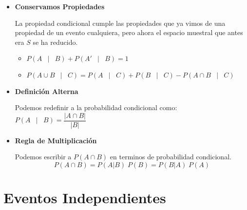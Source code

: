 \documentclass[12pt, fleqn]{report}                             %
\DeclareMathOperator \Space     {\quad}                         %
\DeclareMathOperator \MiniSpace {\;}                            %
\newcommand \Such           {\MiniSpace | \MiniSpace}           %
\theoremstyle{break}                                            %
\newcommand{\Wrap}[1]           {\left( #1 \right)}             %
\newcommand{\Mag}[1]    {\left| #1 \right|}                     %
\begin{document}
                \begin{itemize}

                    \item
                        \textbf{Conservamos Propiedades}

                        La propiedad condicional cumple las propiedades que ya vimos de una propiedad
                        de un evento cualquiera, pero ahora el espacio muestral que antes era $S$ se
                        ha reducido.

                        \begin{itemize}
                            \item $P\Wrap{ A \Such B} + P\Wrap{ A' \Such B} = 1$
                            \item $P\Wrap{ A \cup B \Such C} 
                                        = P\Wrap{A \Such C} + P\Wrap{B \Such C}
                                        - P\Wrap{A \cap B \Such C}$
                        \end{itemize}


                    \item
                        \textbf{Definición Alterna}

                        Podemos redefinir a la probabilidad condicional como: 
                        $P \Wrap{ A \Such B} = \dfrac{\Mag{A \cap B}}{\Mag{B}}$

                    \item 
                        \textbf{Regla de Multiplicación}

                        Podemos escribir a $P(A \cap B)$ en terminos de probabilidad condicional.
                        \begin{equation*}
                            P(A \cap B)
                            = P(A | B) \; P(B)          
                            = P(B | A) \; P(A) 
                        \end{equation*}

                \end{itemize}

                    

        \clearpage
        \section{Eventos Independientes}
\end{document}
